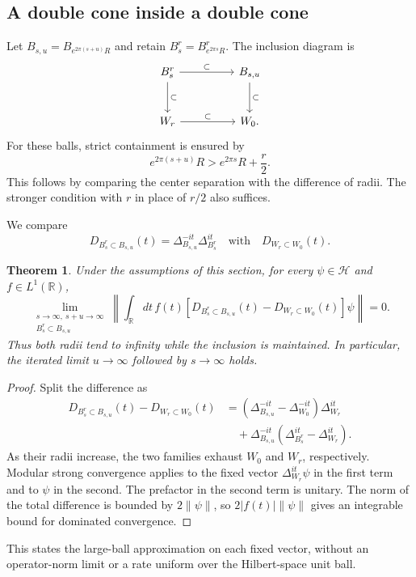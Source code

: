 \documentclass[a4paper,11pt]{article}
\newtheorem{theorem}{Theorem}
\theoremstyle{definition}
\begin{document}
\subsection{A double cone inside a double cone}\label{subsection:coneinsidecone}

Let $B_{s,u}=B_{e^{2\pi(s+u)}R}$ and retain $B_s^r=B_{e^{2\pi s}R}^r$. The inclusion diagram is
\begin{equation}
 \begin{tikzcd}[column sep=huge,row sep=large]
 B_s^r\arrow[r,"\subset"]\arrow[d,"\subset"]
 &B_{s,u}\arrow[d,"\subset"]\\
 W_r\arrow[r,"\subset"]&W_0.
 \end{tikzcd}
\end{equation}
For these balls, strict containment is ensured by
\begin{equation}
 e^{2\pi(s+u)}R>e^{2\pi s}R+\frac r2.
 \label{eq:approx-ball-containment}
\end{equation}
This follows by comparing the center separation with the difference of radii. The stronger condition with $r$ in place of $r/2$ also suffices.

We compare
\begin{equation}
 D_{B_s^r\subset B_{s,u}}(t)=\Delta_{B_{s,u}}^{-it}\Delta_{B_s^r}^{it}
 \quad\text{with}\quad D_{W_r\subset W_0}(t).
\end{equation}

\begin{theorem}\label{theorem:ballinsideball}
Under the assumptions of this section, for every $\psi\in\mathcal H$ and
$f\in L^1(\mathbb R)$,
\begin{equation}
 \lim_{\substack{s\to\infty,\ s+u\to\infty\\ B_s^r\subset B_{s,u}}}
 \left\|\int_{\mathbb R}dt\,f(t)
 [D_{B_s^r\subset B_{s,u}}(t)-D_{W_r\subset W_0}(t)]\psi\right\|=0.
 \label{eq:approx-ball-ball-limit}
\end{equation}
Thus both radii tend to infinity while the inclusion is maintained. In particular,
the iterated limit $u\to\infty$ followed by $s\to\infty$ holds.
\end{theorem}
\begin{proof}
Split the difference as
\begin{align}
 D_{B_s^r\subset B_{s,u}}(t)-D_{W_r\subset W_0}(t)
 &=(\Delta_{B_{s,u}}^{-it}-\Delta_{W_0}^{-it})\Delta_{W_r}^{it}\nonumber\\
 &\quad+\Delta_{B_{s,u}}^{-it}
 (\Delta_{B_s^r}^{it}-\Delta_{W_r}^{it}).
\end{align}
As their radii increase, the two families exhaust $W_0$ and $W_r$, respectively.
Modular strong convergence applies to the fixed vector $\Delta_{W_r}^{it}\psi$
in the first term and to $\psi$ in the second. The prefactor in the second term
is unitary. The norm of the total difference is bounded by $2\|\psi\|$,
so $2|f(t)|\|\psi\|$ gives an integrable bound for dominated convergence.
\end{proof}
This states the large-ball approximation on each fixed vector, without an
operator-norm limit or a rate uniform over the Hilbert-space unit ball.
\end{document}
